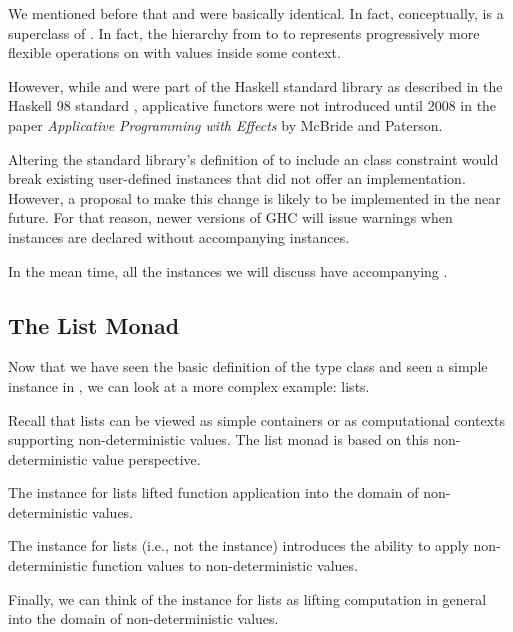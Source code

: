 We mentioned before that  and  were basically identical. In fact, conceptually,
 is a superclass of . In fact, the hierarchy from  to 
to  represents progressively more flexible operations on with values inside some context.

However, while  and  were part of the Haskell standard library as described in the Haskell 98 standard \cite{haskell98},
applicative functors were not introduced until 2008 in the paper \emph{Applicative Programming with Effects} \cite{applicative} by McBride and
Paterson.

Altering the standard library's definition of  to include an  class constraint would break existing user-defined
 instances that did not offer an  implementation. However, a proposal to make this change is likely to be implemented
in the near future. For that reason, newer versions of GHC will issue warnings when  instances are declared without accompanying
 instances. 

In the mean time, all the  instances we will discuss have accompanying .

\subsection{The List Monad}

Now that we have seen the basic definition of the  type class and seen a simple instance in , we
can look at a more complex example: lists.

Recall that lists can be viewed as simple containers or as computational contexts supporting non-deterministic values.
The list monad is based on this non-deterministic value perspective. 

\begin{notelist}
    \item The  instance for lists lifted function application into the domain of non-deterministic values.
    \item The  instance for lists (i.e., not the  instance) introduces the ability to
          apply non-deterministic function values to non-deterministic values.
    \item Finally, we can think of the  instance for lists as lifting computation in general into the
          domain of non-deterministic values.
\end{notelist}

